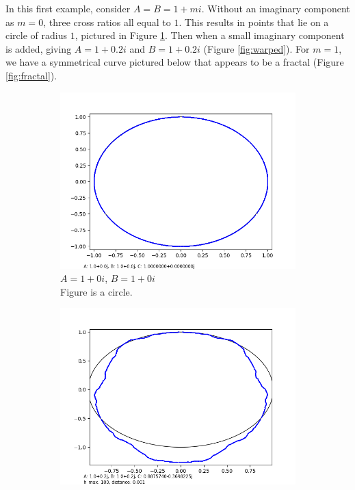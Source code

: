\documentclass[12pt,a4paper,reqno,parskip=full]{amsart}
\numberwithin{equation}{section}
\theoremstyle{plain}
\theoremstyle{definition}
\begin{document}
In this first example, consider $A=B=1+mi$.
Without an imaginary component as $m=0$, three cross ratios all equal to $1$. This results in points that lie on a circle of radius $1$, pictured in Figure \ref{fig:circle}. Then when a small imaginary component is added, giving $A=1+0.2i$ and $B=1+0.2i$ (Figure \ref{fig:warped}). For $m=1$, we have a symmetrical curve pictured below that appears to be a fractal (Figure \ref{fig:fractal}).

\begin{figure}[H]
     \centering
     
     \begin{subfigure}[b]{0.3\textwidth}
         \centering
         \includegraphics[width=\textwidth]{images/nn/a0 b0 h100 d0.001 auto xy.png}
         \caption{$A=1+0i$, $B=1+0i$\\Figure is a circle.}
         \label{fig:circle}
     \end{subfigure}
     \hfill
     \begin{subfigure}[b]{0.3\textwidth}
         \centering
         \includegraphics[width=\textwidth]{images/m/a.2,b.2,h100,d.0010.png}

\end{subfigure}
\end{figure}
\end{document}
